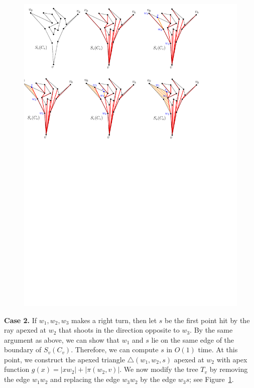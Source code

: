 \documentclass[a4paper,UKenglish]{lipics}
\newcommand{\fn}[2]{\ensuremath{S_{\scriptscriptstyle #1}(#2)}}
\newcommand{\g}[2]{\ensuremath{|\pi(#1, #2)|}}
\begin{document}
\begin{figure}[tb]
\centering
\includegraphics[width=1\textwidth]{img/FunnelCover.pdf}
\caption{\small }
\label{fig:Funnel Cover}
\end{figure}

\textbf{Case 2.} If $w_1, w_2, w_3$ makes a right turn, then let $s$ be the first point hit by the ray apexed at $w_2$ that shoots in the direction opposite to $w_3$. By the same argument as above, we can show that $w_1$ and $s$ lie on the same edge of the boundary of $\fn{v}{C_v}$. Therefore, we can compute $s$ in $O(1)$ time. At this point, we construct the apexed triangle $\triangle(w_1, w_2, s)$ apexed at $w_2$ with apex function $g(x) = |x w_2| + \g{w_2}{v}$.
We now modify the tree $T_v$ by removing the edge $w_1w_2$ and replacing the edge $w_3w_2$ by the edge $w_3s$; see Figure~\ref{fig:Funnel Cover}.
\end{document}
